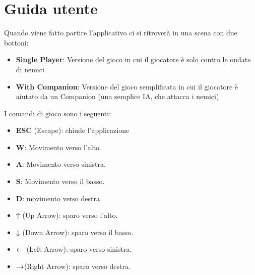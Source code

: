 \documentclass[a4paper,12pt]{report}
\begin{document}
\appendix
\chapter{Guida utente}

Quando viene fatto partire l'applicativo ci si ritroverà in una scena con due bottoni:
\begin{itemize}
    \item \textbf{Single Player}: Versione del gioco in cui il giocatore è solo contro le ondate di nemici.
    \item \textbf{With Companion}: Versione del gioco semplificata in cui il giocatore è aiutato da un Companion (una semplice IA, che attacca i nemici) 
\end{itemize}

I comandi di gioco sono i seguenti:
\begin{itemize}
    \item \textbf{ESC} (Escape): chiude l'applicazione
    \item \textbf{W}: Movimento verso l'alto.
    \item \textbf{A}: Movimento verso sinistra.
    \item \textbf{S}: Movimento verso il basso.
    \item \textbf{D}: movimento verso destra
    \item \textbf{↑} (Up Arrow): sparo verso l'alto.
    \item \textbf{↓} (Down Arrow): sparo verso il basso.
    \item \textbf{←} (Left Arrow): sparo verso sinistra.
    \item \textbf{→}(Right Arrow): sparo verso destra.
\end{itemize}



\end{document}
